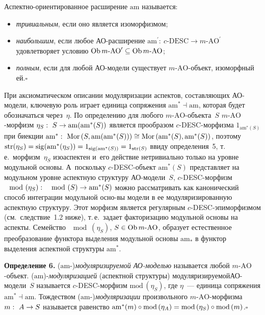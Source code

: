 \begin{multicols}{2}
Аспектно-ориентированное расширение $\mathrm{am}$ называется:
 \begin{itemize}
\item \textit{тривиальным}, если оно является изоморфизмом;
\item \textit{наибольшим}, если любое АО-рас\-ши\-ре\-ние $\mathrm{am}^\prime:\
c\mbox{-}\mathrm{DESC} \to m\mbox{-}\mathrm{AO}^\prime$ удовлетворяет условию
$\mathrm{Ob}\, m\mbox{-}\mathrm{AO}^\prime \hm\subseteq \mathrm{Ob}\, m\mbox{-}\mathrm{AO}$;
\item \textit{полным}, если для любой АО-мо\-де\-ли существует
$m$-$\mathrm{AO}$-объект, изоморфный ей.\hfill$\square$
\end{itemize}

 При аксиоматическом описании модуляризации аспектов, составляющих
АО-мо\-де\-ли, ключевую роль играет единица сопряжения $\mathrm{am}^* \dashv \mathrm{am}$,
которая будет обозначаться через~$\eta$. По определению для любого
 $m$-$\mathrm{AO}$-объек\-та~$S$ $m$-$\mathrm{AO}$-мор\-физм $\eta_S:\ S \hm\to \mathrm{am}(\mathrm{am}^*(S))$
является прообразом $c$-DESC-мор\-физ\-ма $1_{\mathrm{am}^*(S)}$ при биекции $\mathrm{am}^*:\
\mathrm{Mor}\,(S, \mathrm{am}(\mathrm{am}^*(S))) \hm\cong \mathrm{Mor}\,(\mathrm{am}^*(S), \mathrm{am}^*(S))$,
\mbox{поэтому} $\mathrm{str}(\eta_S) \hm= \mathrm{sig}(\mathrm{am}^*(\eta_S)) \hm= 1_{\mathrm{sig}(\mathrm{am}^*(S))} \hm= 1_{\mathrm{str}(S)}$ ввиду
определения~5, т.\,е.\ морфизм~$\eta_S$ изоаспектен и~его действие\linebreak
нетривиально только на уровне модульной основы. А~поскольку
 $c$-DESC-объ\-ект $\mathrm{am}^*(S)$ представляет на модульном уровне
аспектную структуру АО-мо\-де\-ли~$S$, $c$-DESC-мор\-физм $\mod(\eta_S):\
\mod(S) \hm\to \mathrm{am}^*(S)$ можно рассматривать как канонический способ
интеграции модульной осно-\linebreak вы модели в ее модуляризированную аспектную
структуру. Этот морфизм является регулярным
 \mbox{$c$-DESC}-эпи\-мор\-физ\-мом (см.\ следствие~1.2 ниже), т.\,е.\ задает
факторизацию модульной основы на аспекты. \mbox{Семейство} $\mod(\eta_S)$,
$S\hm\in \mathrm{Ob}\, m\mbox{-}\mathrm{AO}$, образует естественное преобразование
функтора выделения модульной основы $\mathrm{am}_*$ в функтор выделения
аспектной структуры $\mathrm{am}^*$.

 \medskip

 \noindent
 \textbf{Определение 6.} ($\mathrm{am}$-)\textit{модуляризируемой АО-мо\-делью}
называется любой $m$-$\mathrm{AO}$-объ\-ект. ($\mathrm{am}$)-\textit{мо\-ду\-ля\-ри\-за\-цией}
(аспектной структуры) модуляризируемой\linebreak АО-мо\-де\-ли~$S$ называется
 $c$-DESC-мор\-физм $\mathrm{mod}\,(\eta_S)$, где $\eta$~--- единица сопряжения
$\mathrm{am}^* \dashv \mathrm{am}$. Тож\-де\-ст\-вом ($\mathrm{am}$-)\textit{модуляризации}
произвольного\linebreak
\mbox{$m$-$\mathrm{AO}$}-мор\-физ\-ма $m:\ A \hm\to S$ называется равенство
$\mathrm{am}^*(m) \circ
\mathrm{mod}\,(\eta_A) \hm= \mathrm{mod}\,(\eta_S) \circ \mathrm{mod}\,(m)$.\hfill$\square$


\end{multicols}
